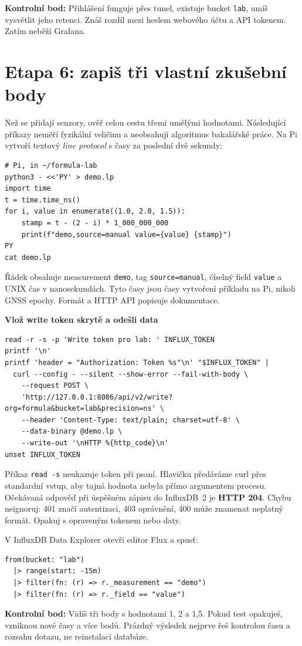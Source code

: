\documentclass[11pt,a4paper]{article}
\newcommand{\krok}[1]{\par\noindent\textbf{#1}\par}
\newcommand{\kontrola}[1]{\par\noindent\textbf{Kontrolní bod:} #1\par}
\begin{document}
\kontrola{Přihlášení funguje přes tunel, existuje bucket \texttt{lab}, umíš vysvětlit jeho retenci. Znáš rozdíl mezi heslem webového účtu a API tokenem. Zatím neběží Grafana.}

\clearpage
\section{Etapa 6: zapiš tři vlastní zkušební body}
Než se přidají senzory, ověř celou cestu třemi umělými hodnotami. Následující příkazy neměří fyzikální veličinu a neobsahují algoritmus bakalářské práce. Na Pi vytvoří textový \emph{line protocol} s časy za poslední dvě sekundy:
\begin{lstlisting}
# Pi, in ~/formula-lab
python3 - <<'PY' > demo.lp
import time
t = time.time_ns()
for i, value in enumerate((1.0, 2.0, 1.5)):
    stamp = t - (2 - i) * 1_000_000_000
    print(f"demo,source=manual value={value} {stamp}")
PY
cat demo.lp
\end{lstlisting}
Řádek obsahuje measurement \texttt{demo}, tag \texttt{source=manual}, číselný field \texttt{value} a UNIX čas v nanosekundách. Tyto časy jsou časy vytvoření příkladu na Pi, nikoli GNSS epochy. Formát a HTTP API popisuje dokumentace.\cite{influx-write,influx-api}

\krok{Vlož write token skrytě a odešli data}
\begin{lstlisting}
read -r -s -p 'Write token pro lab: ' INFLUX_TOKEN
printf '\n'
printf 'header = "Authorization: Token %s"\n' "$INFLUX_TOKEN" |
  curl --config - --silent --show-error --fail-with-body \
    --request POST \
    'http://127.0.0.1:8086/api/v2/write?org=formula&bucket=lab&precision=ns' \
    --header 'Content-Type: text/plain; charset=utf-8' \
    --data-binary @demo.lp \
    --write-out '\nHTTP %{http_code}\n'
unset INFLUX_TOKEN
\end{lstlisting}
Příkaz \texttt{read -s} neukazuje token při psaní. Hlavičku předáváme curl přes standardní vstup, aby tajná hodnota nebyla přímo argumentem procesu. Očekávaná odpověď při úspěšném zápisu do InfluxDB~2 je \textbf{HTTP 204}. Chybu neignoruj: 401 značí autentizaci, 403 oprávnění, 400 může znamenat neplatný formát. Opakuj s opraveným tokenem nebo daty.

V InfluxDB Data Explorer otevři editor Flux a spusť:
\begin{lstlisting}
from(bucket: "lab")
  |> range(start: -15m)
  |> filter(fn: (r) => r._measurement == "demo")
  |> filter(fn: (r) => r._field == "value")
\end{lstlisting}
\kontrola{Vidíš tři body s hodnotami 1, 2 a 1,5. Pokud test opakuješ, vzniknou nové časy a více bodů. Prázdný výsledek nejprve řeš kontrolou času a rozsahu dotazu, ne reinstalací databáze.}
\end{document}
